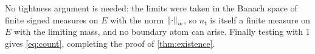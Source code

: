 No tightness argument is needed: the limits were taken in the Banach
space of finite signed measures on $E$ with the norm $\left\lVert \cdot\right\rVert_w$, so
$n_t$ is itself a finite measure on $E$ with the limiting mass, and no
boundary atom can arise. Finally testing with $1$ gives \eqref{eq:count},
completing the proof of \cref{thm:existence}.
